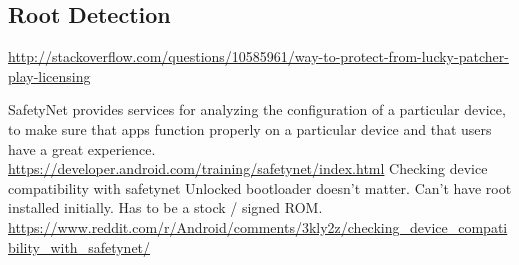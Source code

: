 \subsection{Root Detection}\label{subsection:tampering-root}

\url{http://stackoverflow.com/questions/10585961/way-to-protect-from-lucky-patcher-play-licensing}\newline






SafetyNet provides services for analyzing the configuration of a particular device, to make sure that apps function properly on a particular device and that users have a great experience. \url{https://developer.android.com/training/safetynet/index.html} Checking device compatibility with safetynet\newline
Unlocked bootloader doesn't matter.
Can't have root installed initially.
Has to be a stock / signed ROM.
\url{https://www.reddit.com/r/Android/comments/3kly2z/checking_device_compatibility_with_safetynet/}
